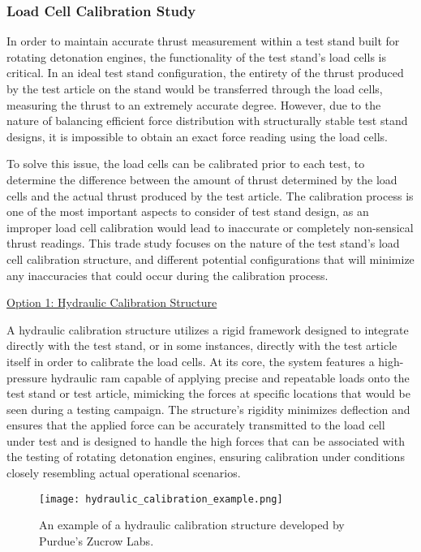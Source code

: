 \subsubsection{Load Cell Calibration Study}

In order to maintain accurate thrust measurement within a test stand built for rotating detonation engines, the functionality of the test stand’s load cells is critical. In an ideal test stand configuration, the entirety of the thrust produced by the test article on the stand would be transferred through the load cells, measuring the thrust to an extremely accurate degree. However, due to the nature of balancing efficient force distribution with structurally stable test stand designs, it is impossible to obtain an exact force reading using the load cells.

To solve this issue, the load cells can be calibrated prior to each test, to determine the difference between the amount of thrust determined by the load cells and the actual thrust produced by the test article. The calibration process is one of the most important aspects to consider of test stand design, as an improper load cell calibration would lead to inaccurate or completely non-sensical thrust readings. This trade study focuses on the nature of the test stand’s load cell calibration structure, and different potential configurations that will minimize any inaccuracies that could occur during the calibration process.

\noindent\underline{Option 1: Hydraulic Calibration Structure}

A hydraulic calibration structure utilizes a rigid framework designed to integrate directly with the test stand, or in some instances, directly with the test article itself in order to calibrate the load cells. At its core, the system features a high-pressure hydraulic ram capable of applying precise and repeatable loads onto the test stand or test article, mimicking the forces at specific locations that would be seen during a testing campaign. The structure’s rigidity minimizes deflection and ensures that the applied force can be accurately transmitted to the load cell under test and is designed to handle the high forces that can be associated with the testing of rotating detonation engines, ensuring calibration under conditions closely resembling actual operational scenarios.

\begin{figure}
    \centering
    \texttt{[image: hydraulic\_calibration\_example.png]}
    \caption{An example of a hydraulic calibration structure developed by Purdue's Zucrow Labs.}
    \label{fig:hydraulic-calibration-example}
\end{figure}

